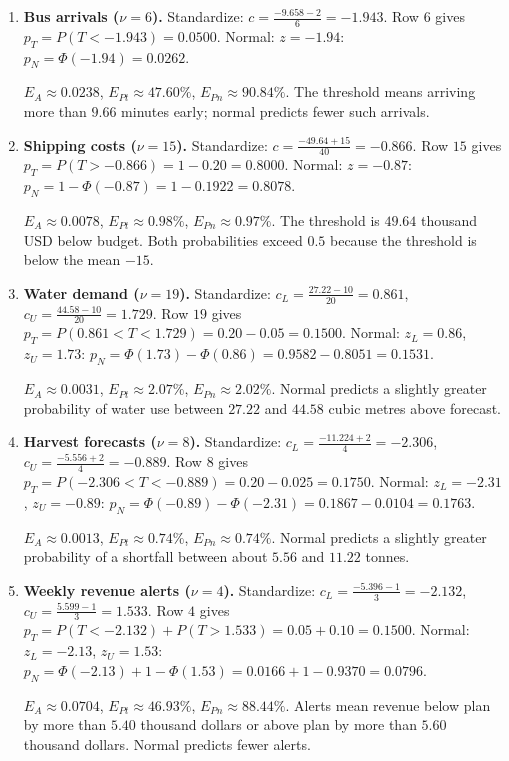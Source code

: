 	\begin{enumerate}[leftmargin=*,label=\textbf{\arabic*.},itemsep=5pt,parsep=1pt,topsep=3pt]
		\item \textbf{Bus arrivals ($\nu=6$).} Standardize: $c=\frac{-9.658-2}{6}=-1.943$. Row $6$ gives $p_T=P(T<-1.943)=0.0500$. Normal: $z=-1.94$: $p_N=\Phi(-1.94)=0.0262$.\par $E_A\approx0.0238$, $E_{Pt}\approx47.60\%$, $E_{Pn}\approx90.84\%$. The threshold means arriving more than $9.66$ minutes early; normal predicts fewer such arrivals.
		\item \textbf{Shipping costs ($\nu=15$).} Standardize: $c=\frac{-49.64+15}{40}=-0.866$. Row $15$ gives $p_T=P(T>-0.866)=1-0.20=0.8000$. Normal: $z=-0.87$: $p_N=1-\Phi(-0.87)=1-0.1922=0.8078$.\par $E_A\approx0.0078$, $E_{Pt}\approx0.98\%$, $E_{Pn}\approx0.97\%$. The threshold is $49.64$ thousand USD below budget. Both probabilities exceed $0.5$ because the threshold is below the mean $-15$.
		\item \textbf{Water demand ($\nu=19$).} Standardize: $c_L=\frac{27.22-10}{20}=0.861$, $c_U=\frac{44.58-10}{20}=1.729$. Row $19$ gives $p_T=P(0.861<T<1.729)=0.20-0.05=0.1500$. Normal: $z_L=0.86$, $z_U=1.73$: $p_N=\Phi(1.73)-\Phi(0.86)=0.9582-0.8051=0.1531$.\par $E_A\approx0.0031$, $E_{Pt}\approx2.07\%$, $E_{Pn}\approx2.02\%$. Normal predicts a slightly greater probability of water use between $27.22$ and $44.58$ cubic metres above forecast.
		\item \textbf{Harvest forecasts ($\nu=8$).} Standardize: $c_L=\frac{-11.224+2}{4}=-2.306$, $c_U=\frac{-5.556+2}{4}=-0.889$. Row $8$ gives $p_T=P(-2.306<T<-0.889)=0.20-0.025=0.1750$. Normal: $z_L=-2.31$, $z_U=-0.89$: $p_N=\Phi(-0.89)-\Phi(-2.31)=0.1867-0.0104=0.1763$.\par $E_A\approx0.0013$, $E_{Pt}\approx0.74\%$, $E_{Pn}\approx0.74\%$. Normal predicts a slightly greater probability of a shortfall between about $5.56$ and $11.22$ tonnes.
		\item \textbf{Weekly revenue alerts ($\nu=4$).} Standardize: $c_L=\frac{-5.396-1}{3}=-2.132$, $c_U=\frac{5.599-1}{3}=1.533$. Row $4$ gives $p_T=P(T<-2.132)+P(T>1.533)=0.05+0.10=0.1500$. Normal: $z_L=-2.13$, $z_U=1.53$: $p_N=\Phi(-2.13)+1-\Phi(1.53)=0.0166+1-0.9370=0.0796$.\par $E_A\approx0.0704$, $E_{Pt}\approx46.93\%$, $E_{Pn}\approx88.44\%$. Alerts mean revenue below plan by more than $5.40$ thousand dollars or above plan by more than $5.60$ thousand dollars. Normal predicts fewer alerts.

\end{enumerate}
